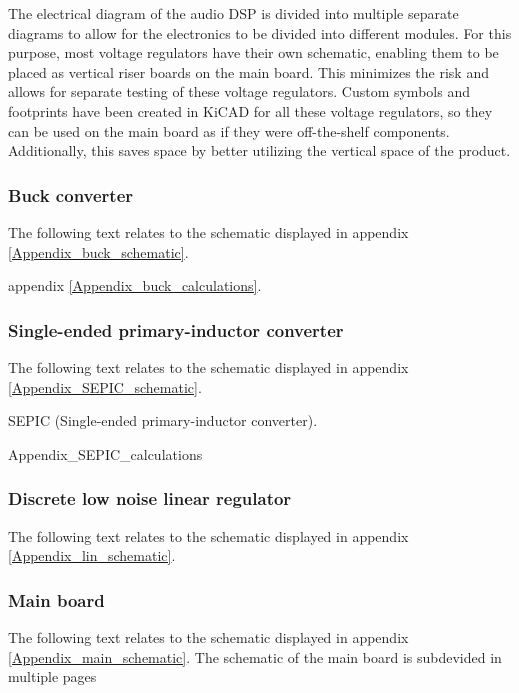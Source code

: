 The electrical diagram of the audio DSP is divided into multiple separate diagrams to allow for the electronics to be divided into different modules. For this purpose, most voltage regulators have their own schematic, enabling them to be placed as vertical riser boards on the main board. This minimizes the risk and allows for separate testing of these voltage regulators. Custom symbols and footprints have been created in KiCAD for all these voltage regulators, so they can be used on the main board as if they were off-the-shelf components. Additionally, this saves space by better utilizing the vertical space of the product.

\subsubsection{Buck converter}
The following text relates to the schematic displayed in appendix \ref{Appendix_buck_schematic}.



appendix \ref{Appendix_buck_calculations}.

\subsubsection{Single-ended primary-inductor converter}
The following text relates to the schematic displayed in appendix \ref{Appendix_SEPIC_schematic}.

SEPIC (Single-ended primary-inductor converter).


Appendix\_SEPIC\_calculations


\subsubsection{Discrete low noise linear regulator}
The following text relates to the schematic displayed in appendix \ref{Appendix_lin_schematic}.

\subsubsection{Main board}
The following text relates to the schematic displayed in appendix \ref{Appendix_main_schematic}.
The schematic of the main board is subdevided in multiple pages